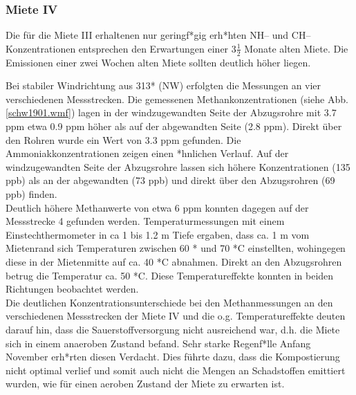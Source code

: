 \subsubsection{\label{miete4} Miete IV}

Die für die Miete III erhaltenen nur geringf*gig erh*hten
NH-- und CH--Kon\-zen\-tra\-tio\-nen entsprechen
den Erwartungen einer $3\frac{1}{2}$ Monate alten Miete. Die
Emissionen einer zwei Wochen alten Miete sollten deutlich höher
liegen.\\


Bei stabiler Windrichtung aus 313* (NW) erfolgten die Messungen an
vier verschiedenen Messstrecken. Die gemessenen
Methankonzentrationen (siehe Abb. \ref{schw1901.wmf}) lagen in der
windzugewandten Seite der Abzugsrohre mit 3.7 ppm etwa 0.9 ppm
höher als auf der abgewandten Seite (2.8 ppm). Direkt über den
Rohren wurde ein Wert von 3.3 ppm gefunden. Die
Ammoniakkonzentrationen zeigen einen *hnlichen Verlauf. Auf der
windzugewandten Seite der Abzugsrohre lassen sich höhere
Konzentrationen (135 ppb) als an der abgewandten (73 ppb) und
direkt über den Abzugsrohren (69 ppb) finden.\\

Deutlich höhere Methanwerte von etwa 6 ppm konnten dagegen auf der
Messstrecke 4 gefunden werden. Temperaturmessungen mit einem
Einstechthermometer in ca 1 bis 1.2 m Tiefe ergaben, dass ca. 1 m
vom Mietenrand sich Temperaturen zwischen 60 * und 70 *C
einstellten, wohingegen diese in der Mietenmitte auf ca. 40 *C
abnahmen. Direkt an den Abzugsrohren betrug die Temperatur ca. 50
*C. Diese Temperatureffekte konnten in beiden Richtungen
beobachtet werden.\\

Die deutlichen Konzentrationsunterschiede bei den Methanmessungen
an den verschiedenen Messstrecken der Miete IV und die o.g.
Temperatureffekte deuten darauf hin, dass die Sauerstoffversorgung
nicht ausreichend war, d.h. die Miete sich in einem anaeroben
Zustand befand. Sehr starke Regenf*lle Anfang November erh*rten
diesen Verdacht. Dies führte dazu, dass die Kompostierung nicht
optimal verlief und somit auch nicht die Mengen an Schadstoffen
emittiert wurden, wie für einen aeroben Zustand der Miete zu
erwarten ist.\\


